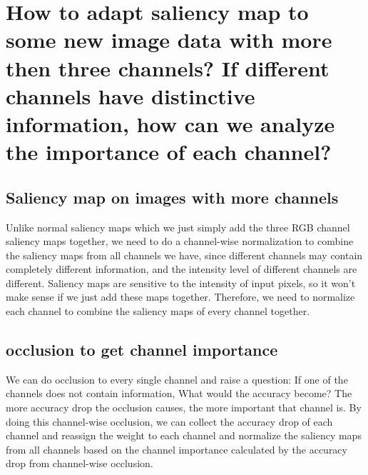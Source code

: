 \documentclass{article}
\begin{document}
\section{How to adapt saliency map to some new image data with more then three channels? If different channels have distinctive information, how can we analyze the importance of each channel?}
\subsection{Saliency map on images with more channels}
Unlike normal saliency maps which we just simply add the three RGB channel saliency maps together, we need to do a channel-wise normalization to combine the saliency maps from all channels we have, since different channels may contain completely different information, and the intensity level of different channels are different. Saliency maps are sensitive to the intensity of input pixels, so it won’t make sense if we just add these maps together. Therefore, we need to normalize each channel to combine the saliency maps of every channel together.

\subsection{occlusion to get channel importance}
We can do occlusion to every single channel and raise a question: If one of the channels does not contain information, What would the accuracy become? The more accuracy drop the occlusion causes, the more important that channel is. By doing this channel-wise occlusion, we can collect the accuracy drop of each channel and reassign the weight to each channel and normalize the saliency maps from all channels based on the channel importance calculated by the accuracy drop from channel-wise occlusion. 
\end{document}
